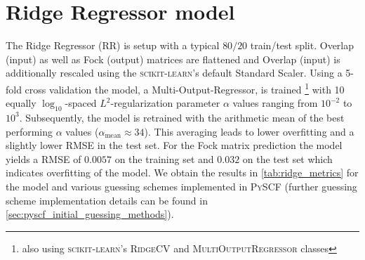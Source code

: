 \section{Ridge Regressor model} %
\label{sec:ridge_regressor_model}
The Ridge Regressor (RR) is setup with a typical $80 / 20$ train/test split. Overlap (input) as well as Fock (output) matrices are flattened and Overlap (input) is additionally rescaled using the \textsc{scikit-learn}'s default Standard Scaler. \parencite{ref:sk-learn} Using a 5-fold cross validation the model, a Multi-Output-Regressor, is trained \footnote{also using \textsc{scikit-learn}'s \textsc{RidgeCV} and \textsc{MultiOutputRegressor} classes} with 10 equally $\log_{10}$-spaced $L^2$-regularization parameter $\alpha$ values ranging from $10^{-2}$ to $10^{3}$. Subsequently, the model is retrained with the arithmetic mean of the best performing $\alpha$ values ($\alpha_{\text{mean}} \approx 34$). This averaging leads to lower overfitting and a slightly lower RMSE in the test set. %
For the Fock matrix prediction the model yields a RMSE of $0.0057$ on the training set and $0.032$ on the test set which indicates overfitting of the model. We obtain the results in \autoref{tab:ridge_metrics} for the model and various guessing schemes implemented in \textsc{PySCF} (further guessing scheme implementation details can be found in \autoref{sec:pyscf_initial_guessing_methods}).

